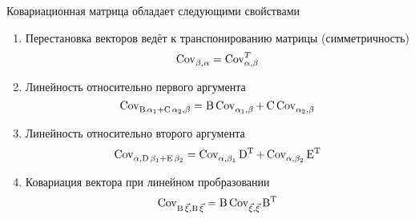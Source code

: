\begin{theorem}\label{th:covMatrix:properties}
Ковариационная матрица обладает следующими свойствами
  \begin{enumerate}
    \item\label{item:covMatrix:property:transposition}
        Перестановка векторов ведёт к транспонированию матрицы (симметричность)
        $$\operatorname{Cov}^{}_{\beta, \alpha} = \operatorname{Cov}^{T}_{\alpha, \beta}$$
    \item\label{item:covMatrix:property:linearityL}
        Линейность относительно первого аргумента
        $$\operatorname{Cov}^{}_{\operatorname{B} \alpha_1 + \operatorname{C} \alpha_2, \beta}
        = \operatorname{B} \operatorname{Cov}^{}_{\alpha_1, \beta}
            + \operatorname{C}\operatorname{Cov}^{}_{\alpha_2, \beta}$$
    \item\label{item:covMatrix:property:linearityR}
        Линейность относительно второго аргумента
        $$\operatorname{Cov}^{}_{\alpha, \operatorname{D} \beta_1 + \operatorname{E} \beta_2}
        = \operatorname{Cov}^{}_{\alpha, \beta_1} \operatorname{D^T}
            + \operatorname{Cov}^{}_{\alpha, \beta_2} \operatorname{E^T}$$
    \item\label{item:covMatrix:property:operatorOut}
        Ковариация вектора при линейном пробразовании
        $$\operatorname{Cov}^{}_{\operatorname{B} \vec{\xi}, \operatorname{B} \vec{\xi}}
        = \operatorname{B} \operatorname{Cov}^{}_{\vec{\xi}, \vec{\xi}} \operatorname{B^T}$$
  \end{enumerate}
\end{theorem}
